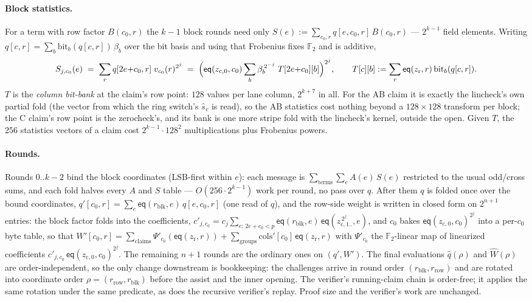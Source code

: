 \documentclass[11pt]{article}
\newcommand{\F}{\mathbb{F}}
\newcommand{\Ftwo}{\F_2}
\newcommand{\eq}{\mathsf{eq}}
\begin{document}
\paragraph{Block statistics.} For a term with row factor $B(c_0, r)$
the $k{-}1$ block rounds need only $S(e) := \sum_{c_0, r} q[e, c_0, r]\,
B(c_0, r)$ --- $2^{k-1}$ field elements. Writing $q[c, r] = \sum_b
\mathrm{bit}_b(q[c,r])\,\beta_b$ over the bit basis and using that
Frobenius fixes $\Ftwo$ and is additive,
\[
  S_{j,c_0}(e)
  \;=\;
  \sum_r q[2e{+}c_0, r]\; v_{c_0}(r)^{2^j}
  \;=\;
  \Bigl(\eq(z_{\mathrm c,0}, c_0)\sum_{b} \beta_b^{\,2^{-j}}\;
        T[2e{+}c_0][b]\Bigr)^{2^j},
  \qquad
  T[c][b] := \sum_r \eq(z_{\mathrm r}, r)\,\mathrm{bit}_b(q[c, r]).
\]
$T$ is the \emph{column bit-bank} at the claim's row point: $128$
values per lane column, $2^{k+7}$ in all. For the AB claim it is
exactly the lincheck's own partial fold (the vector from which the
ring switch's $\hat s_v$ is read), so the AB statistics cost nothing
beyond a $128 \times 128$ transform per block; the C claim's row point
is the zerocheck's, and its bank is one more stripe fold with the
lincheck's kernel, outside the open. Given
$T$, the $256$ statistics vectors of a claim cost $2^{k-1}\cdot 128^2$
multiplications plus Frobenius powers.

\paragraph{Rounds.} Rounds $0..k{-}2$ bind the block coordinates
(LSB-first within $e$): each message is $\sum_{\text{terms}} \sum_{e}
A(e)\,S(e)$ restricted to the usual odd/cross sums, and each fold halves
every $A$ and $S$ table --- $O(256 \cdot 2^{k-1})$ work per round, no
pass over $q$. After them $q$ is folded once over the bound
coordinates, $q'[c_0, r] = \sum_{e} \eq(r_{\mathrm{blk}}, e)\, q[e,
c_0, r]$ (one read of $q$), and the row-side weight is written in
closed form on $2^{n+1}$ entries: the block factor folds into the
coefficients,
$c'_{j,c_0} = c_j \sum_{e:\,2e+c_0<p} \eq(r_{\mathrm{blk}}, e)\,
\eq(z_{\mathrm c,1..}^{\,2^j}, e)$, and $c_0$ bakes
$\eq(z_{\mathrm c,0}, c_0)^{2^j}$ into a per-$c_0$ byte table, so that
$W'[c_0, r] = \sum_{\text{claims}} \Psi'_{c_0}(\eq(z_{\mathrm r}, r))
+ \sum_{\text{groups}} \mathrm{cols}'[c_0]\,\eq(z_{\mathrm r}, r)$ with
$\Psi'_{c_0}$ the $\Ftwo$-linear map of linearized coefficients
$c'_{j,c_0}\,\eq(z_{\mathrm c,0}, c_0)^{2^j}$. The remaining $n{+}1$
rounds are the ordinary ones on $(q', W')$. The final evaluations
$\hat q(\rho)$ and $\widehat W(\rho)$ are order-independent, so the
only change downstream is bookkeeping: the challenges arrive in round
order $(r_{\mathrm{blk}}, r_{\mathrm{row}})$ and are rotated into
coordinate order $\rho = (r_{\mathrm{row}}, r_{\mathrm{blk}})$ before
the assist and the inner opening. The verifier's running-claim chain
is order-free; it applies the same rotation under the same predicate,
as does the recursive verifier's replay. Proof size and the verifier's
work are unchanged.
\end{document}
